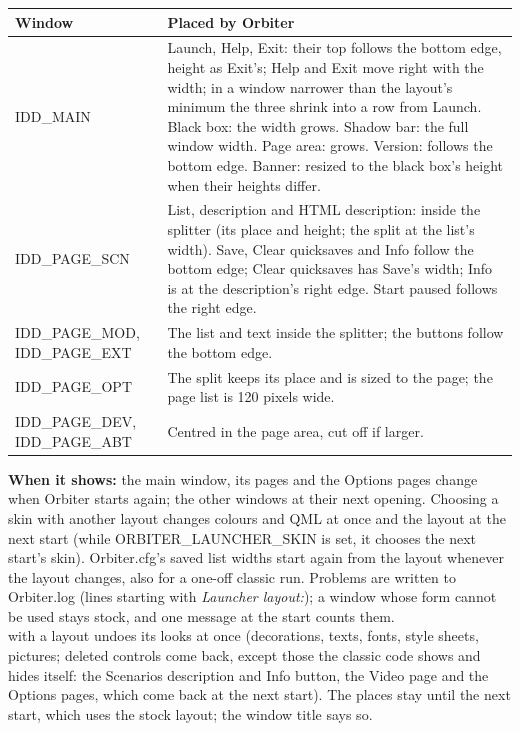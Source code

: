 \documentclass[Orbiter Developer Manual.tex]{subfiles}
\begin{document}
\begin{sloppypar}
	\begin{longtable}{ |p{}|p{}| }
	\hline\rule{0pt}{2ex}
	\textbf{Window} & \textbf{Placed by Orbiter}\\
	\hline\rule{0pt}{2ex}
	IDD\_MAIN & Launch, Help, Exit: their top follows the bottom edge, height as Exit's; Help and Exit move right with the width; in a window narrower than the layout's minimum the three shrink into a row from Launch. Black box: the width grows. Shadow bar: the full window width. Page area: grows. Version: follows the bottom edge. Banner: resized to the black box's height when their heights differ.\\
	\hline\rule{0pt}{2ex}
	IDD\_PAGE\_SCN & List, description and HTML description: inside the splitter (its place and height; the split at the list's width). Save, Clear quicksaves and Info follow the bottom edge; Clear quicksaves has Save's width; Info is at the description's right edge. Start paused follows the right edge.\\
	\hline\rule{0pt}{2ex}
	IDD\_PAGE\_MOD, IDD\_PAGE\_EXT & The list and text inside the splitter; the buttons follow the bottom edge.\\
	\hline\rule{0pt}{2ex}
	IDD\_PAGE\_OPT & The split keeps its place and is sized to the page; the page list is 120 pixels wide.\\
	\hline\rule{0pt}{2ex}
	IDD\_PAGE\_DEV, IDD\_PAGE\_ABT & Centred in the page area, cut off if larger.\\
	\hline
	\end{longtable}

\noindent
\textbf{When it shows:} the main window, its pages and the Options pages change when Orbiter starts again; the other windows at their next opening. Choosing a skin with another layout changes colours and QML at once and the layout at the next start (while ORBITER\_LAUNCHER\_SKIN is set, it chooses the next start's skin). Orbiter.cfg's saved list widths start again from the layout whenever the layout changes, also for a one-off classic run. Problems are written to Orbiter.log (lines starting with \textit{Launcher layout:}); a window whose form cannot be used stays stock, and one message at the start counts them.\\
\Ctrl\Shift{} with a layout undoes its looks at once (decorations, texts, fonts, style sheets, pictures; deleted controls come back, except those the classic code shows and hides itself: the Scenarios description and Info button, the Video page and the Options pages, which come back at the next start). The places stay until the next start, which uses the stock layout; the window title says so.



\end{sloppypar}
\end{document}
